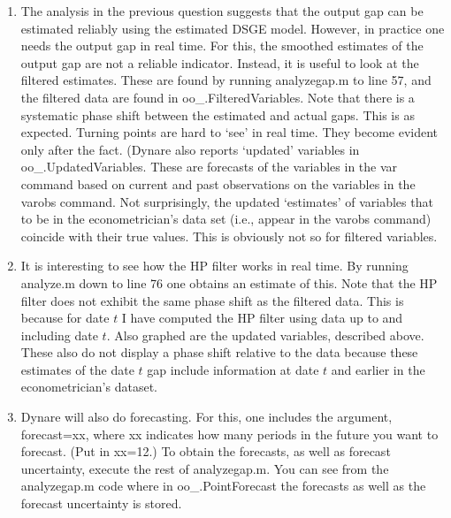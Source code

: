\documentclass[12pt,thmsa]{article}
\begin{document}
\begin{enumerate}
\item The analysis in the previous question suggests that the output gap can
be estimated reliably using the estimated DSGE model. However, in practice
one needs the output gap in real time. For this, the smoothed estimates of
the output gap are not a reliable indicator. Instead, it is useful to look
at the filtered estimates. These are found by running analyzegap.m to line
57, and the filtered data are found in oo\_.FilteredVariables. Note that
there is a systematic phase shift between the estimated and actual gaps.
This is as expected. Turning points are hard to `see' in real time. They
become evident only after the fact. (Dynare also reports `updated' variables
in oo\_.UpdatedVariables. These are forecasts of the variables in the var
command based on current and past observations on the variables in the
varobs command. Not surprisingly, the updated `estimates' of variables that
to be in the econometrician's data set (i.e., appear in the varobs command)
coincide with their true values. This is obviously not so for filtered
variables.

\item It is interesting to see how the HP filter works in real time. By
running analyze.m down to line 76 one obtains an estimate of this. Note that
the HP filter does not exhibit the same phase shift as the filtered data.
This is because for date $t$ I have computed the HP filter using data up to
and including date $t.$ Also graphed are the updated variables, described
above. These also do not display a phase shift relative to the data because
these estimates of the date $t$ gap include information at date $t$ and
earlier in the econometrician's dataset.

\item Dynare will also do forecasting. For this, one includes the argument,
forecast=xx, where xx indicates how many periods in the future you want to
forecast. (Put in xx=12.) To obtain the forecasts, as well as forecast
uncertainty, execute the rest of analyzegap.m. You can see from the
analyzegap.m code where in oo\_.PointForecast the forecasts as well as the
forecast uncertainty is stored.
\end{enumerate}
\end{document}
